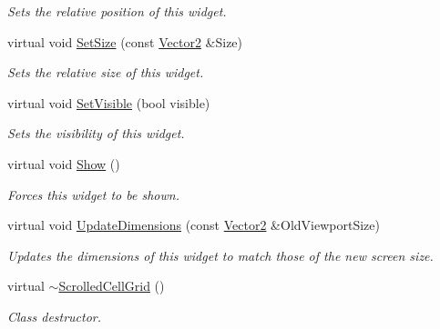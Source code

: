 \begin{DoxyCompactItemize}
\begin{DoxyCompactList}\small\item\em Sets the relative position of this widget. \item\end{DoxyCompactList}\item 
virtual void \hyperlink{classphys_1_1UI_1_1ScrolledCellGrid_a793a775a3603e71db5ad29686c27ae68}{SetSize} (const \hyperlink{classphys_1_1Vector2}{Vector2} \&Size)
\begin{DoxyCompactList}\small\item\em Sets the relative size of this widget. \item\end{DoxyCompactList}\item 
virtual void \hyperlink{classphys_1_1UI_1_1ScrolledCellGrid_aef5b78f205e75d33fff05623a1b61aa4}{SetVisible} (bool visible)
\begin{DoxyCompactList}\small\item\em Sets the visibility of this widget. \item\end{DoxyCompactList}\item 
virtual void \hyperlink{classphys_1_1UI_1_1ScrolledCellGrid_af75c87ada3a1bac3dda208485ebc5f94}{Show} ()
\begin{DoxyCompactList}\small\item\em Forces this widget to be shown. \item\end{DoxyCompactList}\item 
virtual void \hyperlink{classphys_1_1UI_1_1ScrolledCellGrid_aed1f61cbdab04c555e26076ec933bbf2}{UpdateDimensions} (const \hyperlink{classphys_1_1Vector2}{Vector2} \&OldViewportSize)
\begin{DoxyCompactList}\small\item\em Updates the dimensions of this widget to match those of the new screen size. \item\end{DoxyCompactList}\item 
\hypertarget{classphys_1_1UI_1_1ScrolledCellGrid_a27a91d4fe26c101718f8593c8775f0cb}{
virtual \hyperlink{classphys_1_1UI_1_1ScrolledCellGrid_a27a91d4fe26c101718f8593c8775f0cb}{$\sim$ScrolledCellGrid} ()}
\label{classphys_1_1UI_1_1ScrolledCellGrid_a27a91d4fe26c101718f8593c8775f0cb}

\begin{DoxyCompactList}\small\item\em Class destructor. \item\end{DoxyCompactList}\end{DoxyCompactItemize}
